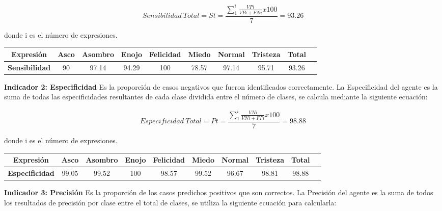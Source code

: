 \begin{equation}
Sensibilidad~Total=St=\frac{\sum_{1}^{i}\frac{VPi}{VPi+FNi}x100}{7}=93.26
\end{equation}

donde i es el número de expresiones. 

\begin{table}[ht!]
\centering
\begin{tabular}{|c|c|c|c|c|c|c|c|c|c|} \hline
\bf Expresión & \bf Asco & \bf Asombro & \bf Enojo & \bf Felicidad & \bf Miedo & \bf Normal & \bf Tristeza & \bf Total \\ \hline
\bf Sensibilidad & 90 & 97.14 & 94.29 & 100 & 78.57 & 97.14 & 95.71 & 93.26 \\ \hline

\end{tabular}
\end{table}

\vskip 1cm

{\bf Indicador 2: Especificidad} \vskip 0.1cm
Es la proporción de casos negativos que fueron identificados correctamente. La Especificidad del agente es la suma de todas las especificidades resultantes de cada clase dividida entre el número de clases, se calcula mediante la siguiente ecuación:

\begin{equation}
Especificidad~Total=Pt=\frac{\sum_{1}^{i}\frac{VNi}{VNi+FPi}x100}{7}=98.88
\end{equation}

donde i es el número de expresiones. 

\begin{table}[ht!]
\centering
\begin{tabular}{|c|c|c|c|c|c|c|c|c|c|} \hline
\bf Expresión & \bf Asco & \bf Asombro & \bf Enojo & \bf Felicidad & \bf Miedo & \bf Normal & \bf Tristeza & \bf Total \\ \hline
\bf Especificidad & 99.05 & 99.52 & 100 & 98.57 & 99.52 & 96.67 & 98.81 & 98.88 \\ \hline

\end{tabular}
\end{table}

\vskip 1cm

{\bf Indicador 3: Precisión} \vskip 0.1cm
Es la proporción de los casos predichos positivos que son correctos. La Precisión del agente es la suma de todos los resultados de precisión por clase entre el total de clases, se utiliza la siguiente ecuación para calcularla:

